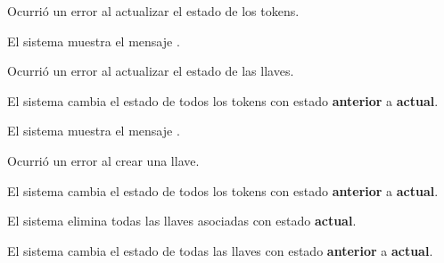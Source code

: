 {\begin{trayectoriaAlternativa}
  \end{trayectoriaAlternativa}

  \begin{trayectoriaAlternativa}
    {Ocurrió un error al actualizar el estado de los tokens.}

    \item El sistema muestra el mensaje
      .


  \end{trayectoriaAlternativa}

  \begin{trayectoriaAlternativa}
    {Ocurrió un error al actualizar el estado de las llaves.}

    \item El sistema cambia el estado de todos los tokens con estado
      \textbf{anterior} a \textbf{actual}.

    \item El sistema muestra el mensaje
      .


  \end{trayectoriaAlternativa}

  \begin{trayectoriaAlternativa}
    {Ocurrió un error al crear una llave.}

    \item El sistema cambia el estado de todos los tokens con estado
      \textbf{anterior} a \textbf{actual}.

    \item El sistema elimina todas las llaves asociadas con estado
      \textbf{actual}.

    \item El sistema cambia el estado de todas las llaves con estado
      \textbf{anterior} a \textbf{actual}.


\end{trayectoriaAlternativa}}
